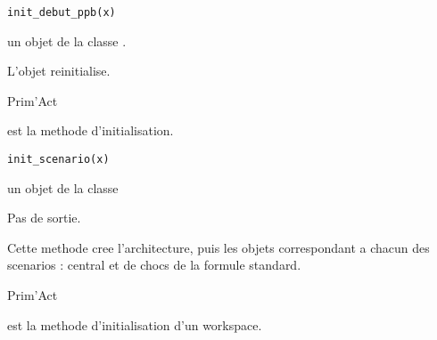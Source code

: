 \documentclass[a4paper]{book}
\begin{document}
%
\begin{Usage}
\begin{verbatim}
init_debut_ppb(x)
\end{verbatim}
\end{Usage}
%
\begin{Arguments}
\begin{ldescription}
\item[\code{x}] un objet de la classe .
\end{ldescription}
\end{Arguments}
%
\begin{Value}
L'objet  reinitialise.
\end{Value}
%
\begin{Author}\relax
Prim'Act
\end{Author}
%
\begin{Description}\relax
{} est la methode d'initialisation.
\end{Description}
%
\begin{Usage}
\begin{verbatim}
init_scenario(x)
\end{verbatim}
\end{Usage}
%
\begin{Arguments}
\begin{ldescription}
\item[\code{x}] un objet de la classe 
\end{ldescription}
\end{Arguments}
%
\begin{Value}
Pas de sortie.
\end{Value}
%
\begin{Note}\relax
Cette methode cree l'architecture, puis les objets  correspondant a chacun des scenarios : central et de chocs de la formule standard.
\end{Note}
%
\begin{Author}\relax
Prim'Act
\end{Author}
%
\begin{Description}\relax
{} est la methode d'initialisation d'un workspace.
\end{Description}
\end{document}
